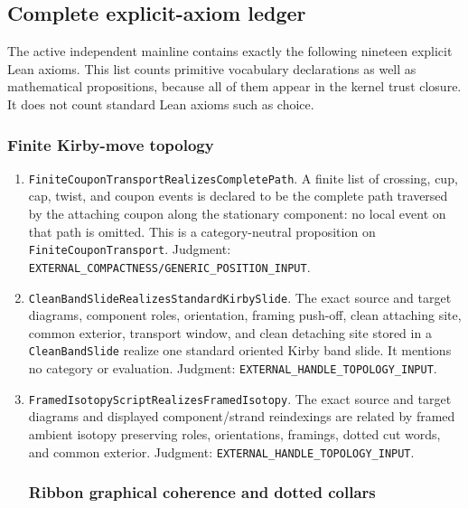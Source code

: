 \subsection{Complete explicit-axiom ledger}
\label{app:lean-explicit-axioms}

The active independent mainline contains exactly the following nineteen
explicit Lean axioms.  This list counts primitive vocabulary declarations as
well as mathematical propositions, because all of them appear in the kernel
trust closure.  It does not count standard Lean axioms such as choice.

\subsubsection*{Finite Kirby-move topology}

\begin{enumerate}[label=\textbf{X\arabic*.},leftmargin=*]

\item \nolinkurl{FiniteCouponTransportRealizesCompletePath}.
A finite list of crossing, cup, cap, twist, and coupon events is declared to
be the complete path traversed by the attaching coupon along the stationary
component: no local event on that path is omitted.  This is a
category-neutral proposition on \texttt{FiniteCouponTransport}.  Judgment:
\nolinkurl{EXTERNAL_COMPACTNESS/GENERIC_POSITION_INPUT}.

\item \nolinkurl{CleanBandSlideRealizesStandardKirbySlide}.
The exact source and target diagrams, component roles, orientation, framing
push-off, clean attaching site, common exterior, transport window, and clean
detaching site stored in a \texttt{CleanBandSlide} realize one standard
oriented Kirby band slide.  It mentions no category or evaluation.  Judgment:
\nolinkurl{EXTERNAL_HANDLE_TOPOLOGY_INPUT}.

\item \nolinkurl{FramedIsotopyScriptRealizesFramedIsotopy}.
The exact source and target diagrams and displayed component/strand
reindexings are related by framed ambient isotopy preserving roles,
orientations, framings, dotted cut words, and common exterior.  Judgment:
\nolinkurl{EXTERNAL_HANDLE_TOPOLOGY_INPUT}.

\subsubsection*{Ribbon graphical coherence and dotted collars}


\end{enumerate}
